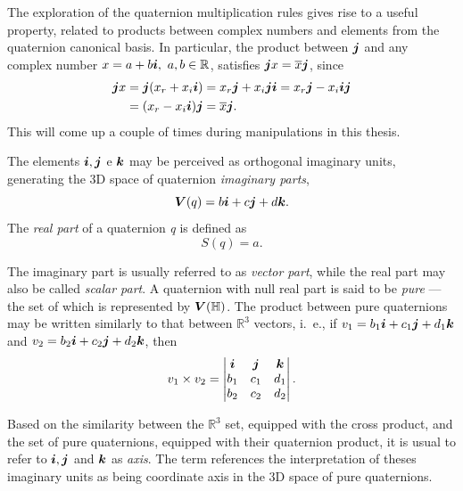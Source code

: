 The exploration of the quaternion multiplication rules gives rise to a useful property, related to products between complex numbers and elements from the quaternion canonical basis. In particular, the product between $\boldsymbol{j}$ and any complex number $x = a + b \boldsymbol{i} , \ a, b \in \mathbb{R}$, satisfies $\boldsymbol{j} x = \overline{x} \boldsymbol{j}$, since
\begin{equation}
    \label{eq:commutej}
    \begin{aligned}
        \boldsymbol{j} x & = \boldsymbol{j} (x_r + x_i \boldsymbol{i}) = x_r \boldsymbol{j} + x_i \boldsymbol{j} \boldsymbol{i} = x_r \boldsymbol{j} - x_i \boldsymbol{i} \boldsymbol{j} \\
              & = (x_r - x_i \boldsymbol{i}) \boldsymbol{j} = \overline{x} \boldsymbol{j}.
    \end{aligned}
\end{equation}
This will come up a couple of times during manipulations in this thesis.

The elements $\boldsymbol{i}, \boldsymbol{j}$ e $\boldsymbol{k}$ may be perceived as orthogonal imaginary units, generating the 3D space of quaternion \textit{imaginary parts},
\begin{equation}
    \boldsymbol{V} (q) = b\boldsymbol{i} + c\boldsymbol{j} + d\boldsymbol{k}.
\end{equation}
The \emph{real part} of a quaternion \emph{q} is defined as
\begin{equation}
    S(q) = a.
\end{equation}

The imaginary part is usually referred to as \textit{vector part}, while the real part may also be called \textit{scalar part}. A quaternion with null real part is said to be \textit{pure} --- the set of which is represented by $\boldsymbol{V}(\mathbb{H})$. The product between pure quaternions may be written similarly to that between $\mathbb{R}^3$ vectors, i.~e., if $v_1 = b_1\boldsymbol{i} + c_1\boldsymbol{j} + d_1\boldsymbol{k}$ and $v_2 = b_2\boldsymbol{i} + c_2\boldsymbol{j} + d_2\boldsymbol{k}$, then
\begin{equation}
    v_1 \times v_2 =
    \begin{vmatrix}
        \boldsymbol{i} & \boldsymbol{j} & \boldsymbol{k} \\
        b_1 & c_1 & d_1 \\
        b_2 & c_2 & d_2
    \end{vmatrix}.
\end{equation}

Based on the similarity between the $ \mathbb{R}^3 $ set, equipped with the cross product, and the set of pure quaternions, equipped with their quaternion product, it is usual to refer to $\boldsymbol{i}, \boldsymbol{j}$ and $\boldsymbol{k}$ as \emph{axis}. The term references the interpretation of theses imaginary units as being coordinate axis in the 3D space of pure quaternions.

